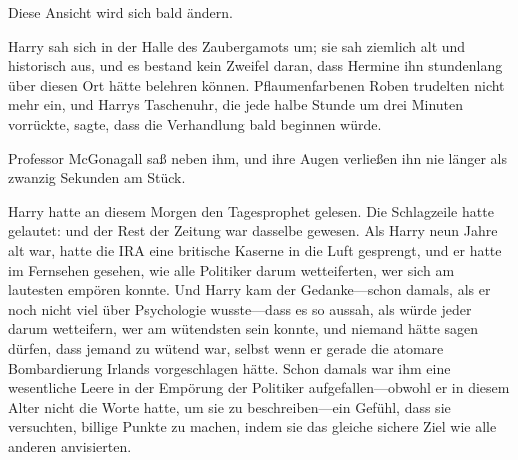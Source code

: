 Diese Ansicht wird sich bald ändern.

\later

Harry sah sich in der Halle des Zaubergamots um; sie sah ziemlich alt und historisch aus, und es bestand kein Zweifel daran, dass Hermine ihn stundenlang über diesen Ort hätte belehren können. Pflaumenfarbenen Roben trudelten nicht mehr ein, und Harrys Taschenuhr, die jede halbe Stunde um drei Minuten vorrückte, sagte, dass die Verhandlung bald beginnen würde.

Professor McGonagall saß neben ihm, und ihre Augen verließen ihn nie länger als zwanzig Sekunden am Stück.

Harry hatte an diesem Morgen den Tagesprophet gelesen. Die Schlagzeile hatte gelautet:
und der Rest der Zeitung war dasselbe gewesen. Als Harry neun Jahre alt war, hatte die IRA eine britische Kaserne in die Luft gesprengt, und er hatte im Fernsehen gesehen, wie alle Politiker darum wetteiferten, wer sich am lautesten empören konnte. Und Harry kam der Gedanke—schon damals, als er noch nicht viel über Psychologie wusste—dass es so aussah, als würde jeder darum wetteifern, wer am wütendsten sein konnte, und niemand hätte sagen dürfen, dass jemand zu wütend war, selbst wenn er gerade die atomare Bombardierung Irlands vorgeschlagen hätte. Schon damals war ihm eine wesentliche Leere in der Empörung der Politiker aufgefallen—obwohl er in diesem Alter nicht die Worte hatte, um sie zu beschreiben—ein Gefühl, dass sie versuchten, billige Punkte zu machen, indem sie das gleiche sichere Ziel wie alle anderen anvisierten.

